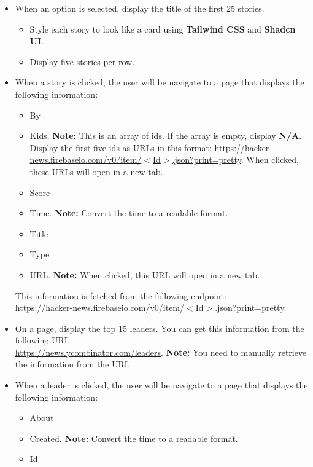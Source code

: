 \documentclass{article}
\begin{document}
\begin{itemize}
\begin{itemize}
\begin{itemize}
	\end{itemize}
	\item When an option is selected, display the title of the first 25 stories.
	\begin{itemize}
		\item Style each story to look like a card using \textbf{Tailwind CSS} and \textbf{Shadcn UI}.
		\item Display five stories per row.
	\end{itemize}
	\item When a story is clicked, the user will be navigate to a page that displays the following information:
	\begin{itemize}
		\item By
		\item Kids. \textbf{Note:} This is an array of ids. If the array is empty, display \textbf{N/A}. Display the first five ids as URLs in this format: \href{https://hacker-news.firebaseio.com/v0/item/$<$Id$>$.json?print=pretty}{https://hacker-news.firebaseio.com/v0/item/$<$Id$>$.json?print=pretty}. When clicked, these URLs will open in a new tab. 
		\item Score
		\item Time. \textbf{Note:} Convert the time to a readable format.
		\item Title
		\item Type 
		\item URL. \textbf{Note:} When clicked, this URL will open in a new tab.
	\end{itemize}
	This information is fetched from the following endpoint:\\
	\href{https://hacker-news.firebaseio.com/v0/item/$<$Id$>$.json?print=pretty}{https://hacker-news.firebaseio.com/v0/item/$<$Id$>$.json?print=pretty}.
	\item On a page, display the top 15 leaders. You can get this information from the following URL:\\
	\href{https://news.ycombinator.com/leaders}{https://news.ycombinator.com/leaders}. \textbf{Note:} You need to manually retrieve the information from the URL. 
	\item When a leader is clicked, the user will be navigate to a page that displays the following information:
	\begin{itemize}
		\item About
		\item Created. \textbf{Note:} Convert the time to a readable format.
		\item Id

\end{itemize}
\end{itemize}
\end{itemize}
\end{document}
